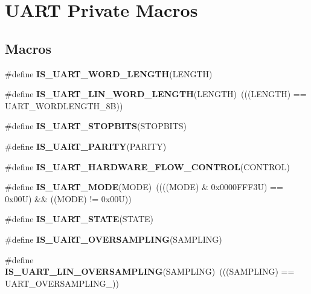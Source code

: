 \hypertarget{group___u_a_r_t___private___macros}{}\section{U\+A\+RT Private Macros}
\label{group___u_a_r_t___private___macros}
\subsection*{Macros}
\begin{DoxyCompactItemize}
\item 
\#define {\bfseries I\+S\+\_\+\+U\+A\+R\+T\+\_\+\+W\+O\+R\+D\+\_\+\+L\+E\+N\+G\+TH}(L\+E\+N\+G\+TH)
\item 
\mbox{\label{group___u_a_r_t___private___macros_ga12e732e82119829947fb0c97da82bd69}} 
\#define {\bfseries I\+S\+\_\+\+U\+A\+R\+T\+\_\+\+L\+I\+N\+\_\+\+W\+O\+R\+D\+\_\+\+L\+E\+N\+G\+TH}(L\+E\+N\+G\+TH)~(((L\+E\+N\+G\+TH) == U\+A\+R\+T\+\_\+\+W\+O\+R\+D\+L\+E\+N\+G\+T\+H\+\_\+8B))
\item 
\#define {\bfseries I\+S\+\_\+\+U\+A\+R\+T\+\_\+\+S\+T\+O\+P\+B\+I\+TS}(S\+T\+O\+P\+B\+I\+TS)
\item 
\#define {\bfseries I\+S\+\_\+\+U\+A\+R\+T\+\_\+\+P\+A\+R\+I\+TY}(P\+A\+R\+I\+TY)
\item 
\#define {\bfseries I\+S\+\_\+\+U\+A\+R\+T\+\_\+\+H\+A\+R\+D\+W\+A\+R\+E\+\_\+\+F\+L\+O\+W\+\_\+\+C\+O\+N\+T\+R\+OL}(C\+O\+N\+T\+R\+OL)
\item 
\mbox{\label{group___u_a_r_t___private___macros_ga748d45fbdc96c743bee170b749f961ba}} 
\#define {\bfseries I\+S\+\_\+\+U\+A\+R\+T\+\_\+\+M\+O\+DE}(M\+O\+DE)~((((M\+O\+DE) \& 0x0000\+F\+F\+F3\+U) == 0x00\+U) \&\& ((\+M\+O\+D\+E) != 0x00\+U))
\item 
\#define {\bfseries I\+S\+\_\+\+U\+A\+R\+T\+\_\+\+S\+T\+A\+TE}(S\+T\+A\+TE)
\item 
\#define {\bfseries I\+S\+\_\+\+U\+A\+R\+T\+\_\+\+O\+V\+E\+R\+S\+A\+M\+P\+L\+I\+NG}(S\+A\+M\+P\+L\+I\+NG)
\item 
\mbox{\label{group___u_a_r_t___private___macros_gacd5577cca731f8ef51badd665f6aa5e6}} 
\#define {\bfseries I\+S\+\_\+\+U\+A\+R\+T\+\_\+\+L\+I\+N\+\_\+\+O\+V\+E\+R\+S\+A\+M\+P\+L\+I\+NG}(S\+A\+M\+P\+L\+I\+NG)~(((S\+A\+M\+P\+L\+I\+NG) == U\+A\+R\+T\+\_\+\+O\+V\+E\+R\+S\+A\+M\+P\+L\+I\+N\+G\+\_))

\end{DoxyCompactItemize}
